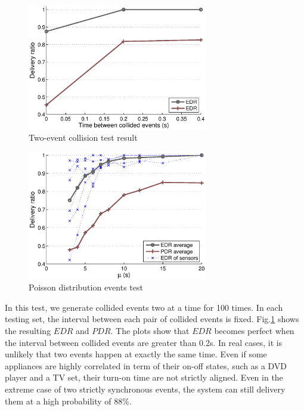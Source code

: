 \begin{figure}[htb]
  \centering
  \includegraphics[width=0.7\textwidth]{../../sw/pc/matlab/testbed-result/collision}
  \caption{Two-event collision test result}
  \label{fig:collision}
\end{figure}

\begin{figure}[htb]
  \centering
  \includegraphics[width=0.7\textwidth]{../../sw/pc/matlab/testbed-result/poisson-5min}
  \caption{Poisson distribution events test}
  \label{fig:poisson-5min}
\end{figure}

In this test, we generate collided events two at a time for 100 times. In each testing set, the interval between each pair of collided events is fixed. Fig.\ref{fig:collision} shows the resulting $EDR$ and $PDR$. The plots show that $EDR$ becomes perfect when the interval between collided events are greater than 0.2s. In real cases, it is unlikely that two events happen at exactly the same time. Even if some appliances are highly correlated in term of their on-off states, such as a DVD player and a TV set, their turn-on time are not strictly aligned. Even in the extreme case of two strictly synchronous events, the system can still delivery them at a high probability of 88\%. 

